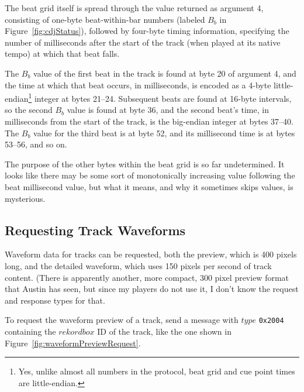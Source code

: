\documentclass[11pt]{article}
\begin{document}
The beat grid itself is spread through the value returned as argument
4, consisting of one-byte beat-within-bar numbers (labeled $B_b$ in
Figure~\ref{fig:cdjStatus}), followed by four-byte timing information,
specifying the number of milliseconds after the start of the track
(when played at its native tempo) at which that beat falls.

The $B_b$ value of the first beat in the track is found at byte 20 of
argument 4, and the time at which that beat occurs, in milliseconds,
is encoded as a 4-byte little-endian\footnote{Yes, unlike almost all
  numbers in the protocol, beat grid and cue point times are
  little-endian.} integer at bytes 21--24. Subsequent beats are found
at 16-byte intervals, so the second $B_b$ value is found at byte 36,
and the second beat's time, in milliseconds from the start of the
track, is the big-endian integer at bytes 37--40. The $B_b$ value for
the third beat is at byte 52, and its millisecond time is at bytes
53--56, and so on.

The purpose of the other bytes within the beat grid is so far
undetermined. It looks like there may be some sort of monotonically
increasing value following the beat millisecond value, but what it
means, and why it sometimes skips values, is mysterious.

\subsection{Requesting Track Waveforms}

Waveform data for tracks can be requested, both the preview, which is
400 pixels long, and the detailed waveform, which uses 150 pixels per
second of track content. (There is apparently another, more compact,
300 pixel preview format that Austin has seen, but since my players do
not use it, I don't know the request and response types for that.

To request the waveform preview of a track, send a message with $type$
{\tt 0x2004} containing the $rekordbox$ ID of the track, like the one
shown in Figure~\ref{fig:waveformPreviewRequest}.
\end{document}
